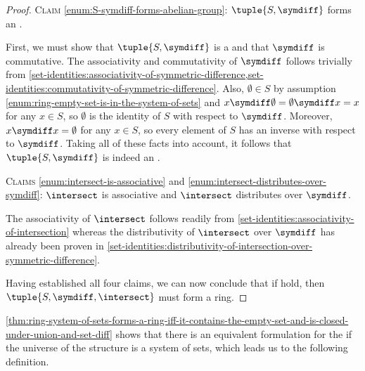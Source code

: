 \begin{proof}
    \vspace{0.3cm}
    \noindent
    \textsc{Claim} \ref{enum:S-symdiff-forms-abelian-group}: \( \tuple{S, \symdiff} \) forms an .

    \vspace{0.1cm}
    \noindent
    First, we must show that \( \tuple{S, \symdiff} \) is a  and that \( \symdiff \) is commutative. The associativity
    and commutativity of \( \symdiff \) follows trivially from
    \cref{set-identities:associativity-of-symmetric-difference,set-identities:commutativity-of-symmetric-difference}.
    Also, \( \emptyset \in S \) by assumption \ref{enum:ring-empty-set-is-in-the-system-of-sets} and
    \( x \symdiff \emptyset = \emptyset \symdiff x = x \) for any \( x \in S \), so \( \emptyset \) is the identity
    of \( S \) with respect to \( \symdiff \). Moreover, \( x \symdiff x = \emptyset \) for any \( x \in S \), so every element of \( S \) has an
    inverse with respect to \( \symdiff \). Taking all of these facts into account, it follows that \( \tuple{S, \symdiff} \) is indeed an
    .

    \vspace{0.5cm}
    \noindent
    \textsc{Claims} \ref{enum:intersect-is-associative} and \ref{enum:intersect-distributes-over-symdiff}:
    \( \intersect \) is associative and \( \intersect \) distributes over \( \symdiff \).

    \vspace{0.1cm}
    \noindent
    The associativity of \( \intersect \) follows readily from \cref{set-identities:associativity-of-intersection}
    whereas the distributivity of \( \intersect \) over \( \symdiff \) has already been proven in
    \cref{set-identities:distributivity-of-intersection-over-symmetric-difference}.

    \vspace{0.3cm}
    \noindent
    Having established all four claims, we can now conclude that if 
    hold, then \( \tuple{S, \symdiff, \intersect} \) must form a ring.
\end{proof}

\noindent
\cref{thm:ring-system-of-sets-forms-a-ring-iff-it-contains-the-empty-set-and-is-closed-under-union-and-set-diff} shows that
there is an equivalent formulation for the  if the universe of the structure is a system of sets,
which leads us to the following definition.

